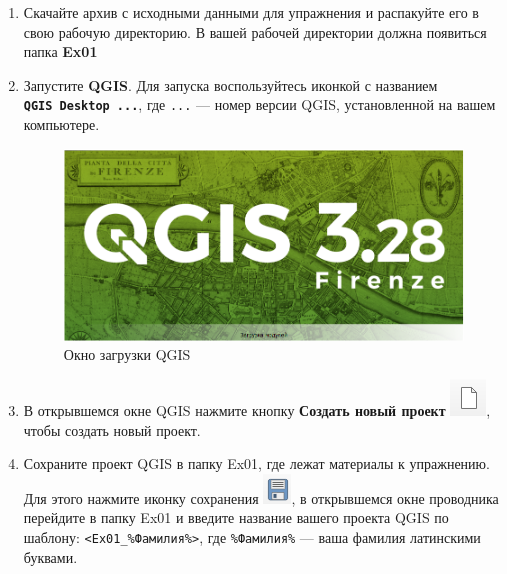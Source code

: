 \documentclass[
  12pt,
]{book}
\begin{document}
\begin{enumerate}
\def\labelenumi{\arabic{enumi}.}
\item
  Скачайте архив с исходными данными для упражнения и распакуйте его в свою рабочую директорию. В вашей рабочей директории должна появиться папка \textbf{Ex01}
\item
  Запустите \textbf{QGIS}. Для запуска воспользуйтесь иконкой с названием \textbf{\texttt{QGIS\ Desktop\ ...}}, где \texttt{...} --- номер версии QGIS, установленной на вашем компьютере.

  \begin{figure}
  \centering
  \includegraphics{images/Ex01_MapGeneral/qgis_loading.png}
  \caption{Окно загрузки QGIS}
  \end{figure}
\item
  В открывшемся окне QGIS нажмите кнопку \textbf{Создать новый проект} \includegraphics{images/Ex01_MapGeneral/new_project_button.png}, чтобы создать новый проект.
\item
  Сохраните проект QGIS в папку Ex01, где лежат материалы к упражнению. Для этого нажмите иконку сохранения \includegraphics{images/Ex01_MapGeneral/save_icon.png}, в открывшемся окне проводника перейдите в папку Ex01 и введите название вашего проекта QGIS по шаблону: \texttt{\textless{}Ex01\_\%Фамилия\%\textgreater{}}, где \texttt{\%Фамилия\%} --- ваша фамилия латинскими буквами.


\end{enumerate}
\end{document}
